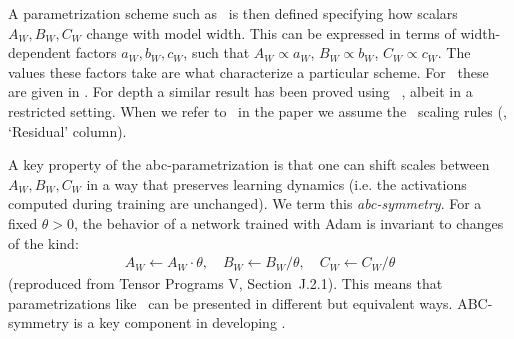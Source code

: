 
A parametrization scheme such as \mup\ is then defined specifying how scalars $A_W,B_W,C_W$ change with model width. This can be expressed in terms of width-dependent factors $a_W, b_W, c_W$, such that $A_W \propto a_W$, $B_W \propto b_W$, $C_W \propto c_W$. The values these factors take are what characterize a particular scheme. For \mup\ these are given in .
For depth a similar result has been proved using \depthmup\ \citep{Tensor_Programs_VI}, albeit in a restricted setting. When we refer to \mup\ in the paper we assume the \depthmup\ scaling rules (, `Residual' column).

A key property of the abc-parametrization is that one can shift scales between $A_W,B_W,C_W$ in a way that preserves learning dynamics (i.e. the activations computed during training are unchanged). We term this \textit{abc-symmetry}. For a fixed $\theta > 0$, the behavior of a network trained with Adam is invariant to changes of the kind:
\begin{align} \label{eq:abc_symmetry}
    A_W \leftarrow A_W \cdot \theta, \quad B_W \leftarrow B_W / \theta, \quad C_W \leftarrow C_W / \theta
\end{align}
(reproduced from Tensor Programs V, Section~J.2.1). This means that parametrizations like \mup\ can be presented in different but equivalent ways. ABC-symmetry is a key component in developing \umup.


